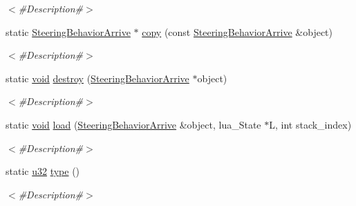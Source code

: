 \begin{DoxyCompactItemize}
\begin{DoxyCompactList}\small\item\em $<$\#\+Description\#$>$ \end{DoxyCompactList}\item 
static \mbox{\hyperlink{classnjli_1_1_steering_behavior_arrive}{Steering\+Behavior\+Arrive}} $\ast$ \mbox{\hyperlink{classnjli_1_1_steering_behavior_arrive_a2756ea4a6c57da84e9d76dafcd8ff0d1}{copy}} (const \mbox{\hyperlink{classnjli_1_1_steering_behavior_arrive}{Steering\+Behavior\+Arrive}} \&object)
\begin{DoxyCompactList}\small\item\em $<$\#\+Description\#$>$ \end{DoxyCompactList}\item 
static \mbox{\hyperlink{_thread_8h_af1e856da2e658414cb2456cb6f7ebc66}{void}} \mbox{\hyperlink{classnjli_1_1_steering_behavior_arrive_a866a9a6076e51f1134dd0b2891780128}{destroy}} (\mbox{\hyperlink{classnjli_1_1_steering_behavior_arrive}{Steering\+Behavior\+Arrive}} $\ast$object)
\begin{DoxyCompactList}\small\item\em $<$\#\+Description\#$>$ \end{DoxyCompactList}\item 
static \mbox{\hyperlink{_thread_8h_af1e856da2e658414cb2456cb6f7ebc66}{void}} \mbox{\hyperlink{classnjli_1_1_steering_behavior_arrive_a38a4e9e532dd6f78619005a099f25ee5}{load}} (\mbox{\hyperlink{classnjli_1_1_steering_behavior_arrive}{Steering\+Behavior\+Arrive}} \&object, lua\+\_\+\+State $\ast$L, int stack\+\_\+index)
\begin{DoxyCompactList}\small\item\em $<$\#\+Description\#$>$ \end{DoxyCompactList}\item 
static \mbox{\hyperlink{_util_8h_a10e94b422ef0c20dcdec20d31a1f5049}{u32}} \mbox{\hyperlink{classnjli_1_1_steering_behavior_arrive_a773e7919cb6643e9eb5b362fc3fac97f}{type}} ()
\begin{DoxyCompactList}\small\item\em $<$\#\+Description\#$>$ \end{DoxyCompactList}\end{DoxyCompactItemize}
